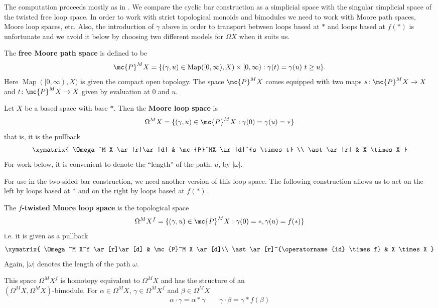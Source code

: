 \documentclass[11pt]{amsart}
\begin{document}
The computation proceeds mostly as in \cite{goodwillie_cyclic}. We compare the cyclic bar construction as a simplicial space with the singular simplicial space of the twisted free loop space. In order to work with strict topological monoids and bimodules we need to work with Moore path spaces, Moore loop spaces, etc. Also, the introduction of $\gamma$ above in order to transport between loops based at $\ast$ and loops based at $f(\ast)$ is unfortunate and we avoid it below by choosing two different models for $\Omega X$ when it suits us. 


\begin{defn}
  The \textbf{free Moore path space} is defined to be 
  \[
  \mc{P}^M X = \{(\gamma, u) \in \operatorname{Map}([0, \infty), X) \times [0, \infty) : \gamma(t) = \gamma(u) \ t \geq u \}.
      \]
     Here $\operatorname{Map}([0,\infty), X)$ is given the compact open topology. The space $\mc{P}^M X$ comes equipped with two maps $s\colon  \mc{P}^M X \to X$ and $t\colon  \mc{P}^M X \to X$ given by evaluation at $0$ and $u$. 
\end{defn}

\begin{defn}
  Let $X$ be a based space with base $\ast$. Then the \textbf{Moore loop space} is 
  \[
  \Omega^M X = \{(\gamma, u) \in \mc{P}^M X : \gamma(0) = \gamma(u) = \ast\} 
  \]
  that is, it is the pullback
  \[
  \xymatrix{
    \Omega^M X \ar[r]\ar[d] & \mc{P}^MX \ar[d]^{s \times t} \\
    \ast\ar[r]  & X \times X 
  }
  \]
  For work below, it is convenient to denote the ``length'' of the path, $u$, by $|\omega|$. 
\end{defn}
For use in the two-sided bar construction, we need another version of this loop space. The following construction allows us to act on the left by loops based at $\ast$ and on the right by loops based at $f(\ast)$.

\begin{defn}\label{defn:twisted_loop_space}
  The \textbf{$f$-twisted Moore loop space} is the topological space 
  \[
  \Omega^M X^f = \{(\gamma, u) \in \mc{P}^M X : \gamma(0) = \ast, \gamma(u) = f(\ast)\}
  \]
  i.e. it is given as a pullback
  \[
  \xymatrix{
    \Omega^M X^f \ar[r]\ar[d] & \mc{P}^M X \ar[d]\\
    \ast \ar[r]^{\operatorname{id} \times f} & X \times X 
  }
  \]
  Again, $|\omega|$ denotes the length of the path $\omega$. 
\end{defn}

  This space $\Omega^M X^f$ is homotopy equivalent to $\Omega^M X$ and has the structure of an \\$(\Omega^M X, \Omega^M X)$-bimodule. For $\alpha \in \Omega^M X$, $\gamma\in \Omega^M X^f$ and $\beta \in \Omega^M X$ 
  \[
  \alpha \cdot \gamma = \alpha \ast \gamma \qquad \gamma \cdot \beta = \gamma \ast f(\beta) 
  \]
\end{document}
